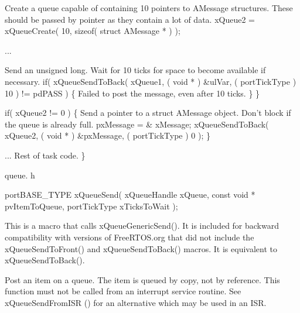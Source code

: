 \begin{DoxyPre}Create a queue capable of containing 10 pointers to AMessage structures.
These should be passed by pointer as they contain a lot of data.
        xQueue2 = xQueueCreate( 10, sizeof( struct AMessage * ) );\end{DoxyPre}



\begin{DoxyPre}...
\begin{DoxyVerb}    if( xQueue1 != 0 )
    {
\end{DoxyVerb}

Send an unsigned long.  Wait for 10 ticks for space to become
available if necessary.
                if( xQueueSendToBack( xQueue1, ( void * ) \&ulVar, ( portTickType ) 10 ) != pdPASS )
                \{
Failed to post the message, even after 10 ticks.
                \}
        \}\end{DoxyPre}



\begin{DoxyPre}        if( xQueue2 != 0 )
        \{
Send a pointer to a struct AMessage object.  Don't block if the
queue is already full.
                pxMessage = \& xMessage;
                xQueueSendToBack( xQueue2, ( void * ) \&pxMessage, ( portTickType ) 0 );
        \}\end{DoxyPre}



\begin{DoxyPre}... Rest of task code.
 \}
 \end{DoxyPre}


queue. h 
\begin{DoxyPre}
 portBASE\_TYPE xQueueSend(
                                                          xQueueHandle xQueue,
                                                          const void * pvItemToQueue,
                                                          portTickType xTicksToWait
                                                 );
   \end{DoxyPre}


This is a macro that calls x\-Queue\-Generic\-Send(). It is included for backward compatibility with versions of Free\-R\-T\-O\-S.\-org that did not include the x\-Queue\-Send\-To\-Front() and x\-Queue\-Send\-To\-Back() macros. It is equivalent to x\-Queue\-Send\-To\-Back().

Post an item on a queue. The item is queued by copy, not by reference. This function must not be called from an interrupt service routine. See x\-Queue\-Send\-From\-I\-S\-R () for an alternative which may be used in an I\-S\-R.


